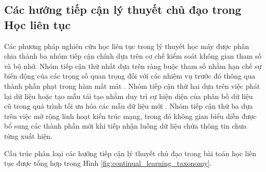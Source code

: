 \subsection{Các hướng tiếp cận lý thuyết chủ đạo trong Học liên tục}

Các phương pháp nghiên cứu học liên tục trong lý thuyết học máy được phân chia thành ba nhóm tiếp cận chính dựa trên cơ chế kiểm soát không gian tham số và bộ nhớ. Nhóm tiếp cận thứ nhất dựa trên ràng buộc tham số nhằm hạn chế sự biến động của các trọng số quan trọng đối với các nhiệm vụ trước đó thông qua thành phần phạt trong hàm mất mát \cite{kirkpatrick2017overcoming}. Nhóm tiếp cận thứ hai dựa trên việc phát lại dữ liệu hoặc tạo mẫu tái tạo nhằm duy trì sự hiện diện của phân bố dữ liệu cũ trong quá trình tối ưu hóa các mẫu dữ liệu mới \cite{lopez2017gradient}. Nhóm tiếp cận thứ ba dựa trên việc mở rộng linh hoạt kiến trúc mạng, trong đó không gian biểu diễn được bổ sung các thành phần mới khi tiếp nhận luồng dữ liệu chứa thông tin chưa từng xuất hiện.

Cấu trúc phân loại các hướng tiếp cận lý thuyết chủ đạo trong bài toán học liên tục được tổng hợp trong Hình \ref{fig:continual_learning_taxonomy}.

